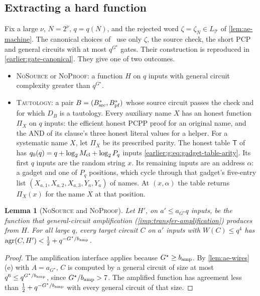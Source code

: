 \documentclass[11pt,letterpaper]{article}
\newtheorem{lemma}[theorem]{Lemma}
\theoremstyle{definition}
\theoremstyle{remark}
\newcommand{\agr}{\operatorname{agr}}
\newcommand{\lgx}{\log_2}
\newcommand{\Tclk}{\mathcal T}
\begin{document}
\subsection{Extracting a hard function}\label{sec:ae-extract}

Fix a large \(\nu\), \(N=2^\nu\), \(q=q(N)\), and the rejected word
\(\zeta=\zeta_N\in L_{\Tclk}\) of \cref{lem:ae-machine}. The canonical
choices of~\cite[Section~11.5, items~(i)--(iii)]{NagCG} use only
\(\zeta\), the source check, the short PCP and general circuits with
at most \(q^{G^\star}\) gates. Their construction is reproduced in
\cref{earlier:gate-canonical}. They give one of
two outcomes.
\begin{itemize}
\item \textsc{NoSource} or \textsc{NoProof}: a function \(H\) on \(q\)
inputs with general circuit complexity greater than \(q^{G^\star}\).
\item \textsc{Tautology}: a pair \(B=(B^*_{\rm src},B^*_{\rm pf})\)
whose source circuit passes the check and for which \(D_B\) is a
tautology. Every auxiliary name \(X\) has an honest function
\(\Pi_X\) on \(q\) inputs: the efficient honest PCPP proof for an
original name, and the AND of its clause's three honest literal values
for a helper. For a systematic name \(X\), let \(\Pi_X\) be its
prescribed parity. The honest table \(\mathsf T\)
of~\cite[Section~11.5]{NagCG} has
\(q_0(q)=q+\lgx M_{\rm cl}+\lgx P_q\)
inputs \eqref{earlier:g:eq:gadget-table-arity}. Its first \(q\) inputs are the
random string \(x\). Its remaining inputs are an address \(\alpha\):
a gadget and one of \(P_q\) positions, which cycle through that
gadget's five-entry list \((X_{a,1},X_{a,2},X_{a,3},Y_a,Y_a)\) of
names. At \((x,\alpha)\) the table returns \(\Pi_X(x)\) for the name
\(X\) at that position.
\end{itemize}

\begin{lemma}[\textsc{NoSource} and \textsc{NoProof}]\label{lem:ae-amplified}
Let \(H'\), on \(a'\le a_{G^\star}q\) inputs, be the function that
general-circuit amplification (\cref{imp:transfer-amplification})
produces from \(H\). For all large \(q\), every target circuit \(C\)
on \(a'\) inputs with \(W(C)\le q^4\) has
\(\agr(C,H')<\tfrac12+q^{-G^\star/b_{\rm amp}}\).
\end{lemma}
\begin{proof}
The amplification interface applies because \(G^\star\ge b_{\rm amp}\). By
\cref{lem:ae-wires}(e) with \(A=a_{G^\star}\), \(C\) is computed by a
general circuit of size at most \(q^6\le q^{G^\star/b_{\rm amp}}\),
since \(G^\star/b_{\rm amp}>7\). The amplified function has agreement
less than \(\frac12+q^{-G^\star/b_{\rm amp}}\) with every general
circuit of that size.
\end{proof}
\end{document}
